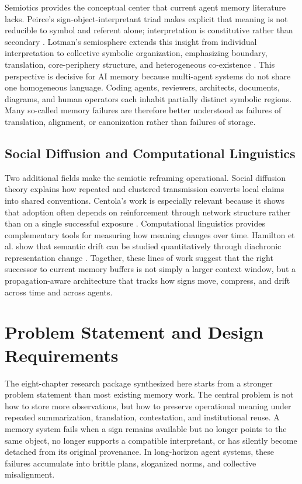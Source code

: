 \documentclass[11pt]{article}
\begin{document}
Semiotics provides the conceptual center that current agent memory literature lacks. Peirce's sign-object-interpretant triad makes explicit that meaning is not reducible to symbol and referent alone; interpretation is constitutive rather than secondary \cite{short2021peirce}. Lotman's semiosphere extends this insight from individual interpretation to collective symbolic organization, emphasizing boundary, translation, core-periphery structure, and heterogeneous co-existence \cite{lotman2005semiosphere, noth2015topography}. This perspective is decisive for AI memory because multi-agent systems do not share one homogeneous language. Coding agents, reviewers, architects, documents, diagrams, and human operators each inhabit partially distinct symbolic regions. Many so-called memory failures are therefore better understood as failures of translation, alignment, or canonization rather than failures of storage.

\subsection{Social Diffusion and Computational Linguistics}

Two additional fields make the semiotic reframing operational. Social diffusion theory explains how repeated and clustered transmission converts local claims into shared conventions. Centola's work is especially relevant because it shows that adoption often depends on reinforcement through network structure rather than on a single successful exposure \cite{centola2010spread}. Computational linguistics provides complementary tools for measuring how meaning changes over time. Hamilton et al. show that semantic drift can be studied quantitatively through diachronic representation change \cite{hamilton2016diachronic}. Together, these lines of work suggest that the right successor to current memory buffers is not simply a larger context window, but a propagation-aware architecture that tracks how signs move, compress, and drift across time and across agents.

\section{Problem Statement and Design Requirements}
\label{sec:problem}

The eight-chapter research package synthesized here starts from a stronger problem statement than most existing memory work. The central problem is not how to store more observations, but how to preserve operational meaning under repeated summarization, translation, contestation, and institutional reuse. A memory system fails when a sign remains available but no longer points to the same object, no longer supports a compatible interpretant, or has silently become detached from its original provenance. In long-horizon agent systems, these failures accumulate into brittle plans, sloganized norms, and collective misalignment.
\end{document}
